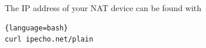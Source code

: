 The IP address of your NAT device can be found with

\begin{lstlisting}{language=bash}
curl ipecho.net/plain
\end{lstlisting}

